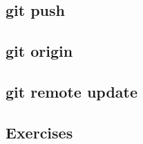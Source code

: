\subsection{git push}
\begin{frame}[fragile]
    \subslidetitle
\end{frame}

\subsection{git origin}
\begin{frame}[fragile]
    \subslidetitle
\end{frame}

\subsection{git remote update}
\begin{frame}[fragile]
    \subslidetitle
\end{frame}

\subsection{Exercises}
\begin{frame}[fragile]
  \subslidetitle
\end{frame}
